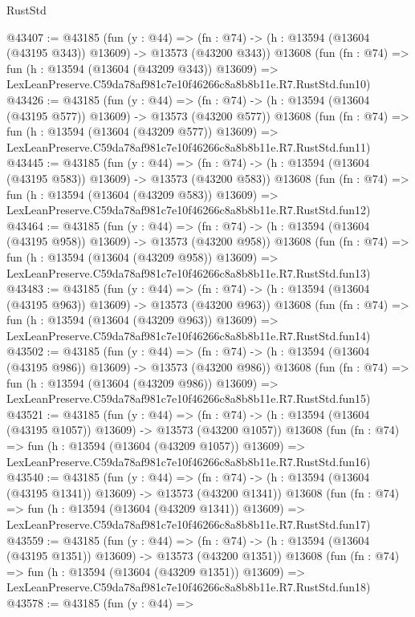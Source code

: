 \begin{lexlean}{RustStd}
\begin{coremodule}
@43407 := @43185
    (fun (y : @44) =>
    (fn : @74) -> (h : @13594 (@13604 (@43195 @343)) @13609) -> @13573 (@43200 @343))
    @13608
    (fun (fn : @74) =>
    fun (h : @13594 (@13604 (@43209 @343)) @13609) =>
    LexLeanPreserve.C59da78af981c7e10f46266c8a8b8b11e.R7.RustStd.fun10)
@43426 := @43185
    (fun (y : @44) =>
    (fn : @74) -> (h : @13594 (@13604 (@43195 @577)) @13609) -> @13573 (@43200 @577))
    @13608
    (fun (fn : @74) =>
    fun (h : @13594 (@13604 (@43209 @577)) @13609) =>
    LexLeanPreserve.C59da78af981c7e10f46266c8a8b8b11e.R7.RustStd.fun11)
@43445 := @43185
    (fun (y : @44) =>
    (fn : @74) -> (h : @13594 (@13604 (@43195 @583)) @13609) -> @13573 (@43200 @583))
    @13608
    (fun (fn : @74) =>
    fun (h : @13594 (@13604 (@43209 @583)) @13609) =>
    LexLeanPreserve.C59da78af981c7e10f46266c8a8b8b11e.R7.RustStd.fun12)
@43464 := @43185
    (fun (y : @44) =>
    (fn : @74) -> (h : @13594 (@13604 (@43195 @958)) @13609) -> @13573 (@43200 @958))
    @13608
    (fun (fn : @74) =>
    fun (h : @13594 (@13604 (@43209 @958)) @13609) =>
    LexLeanPreserve.C59da78af981c7e10f46266c8a8b8b11e.R7.RustStd.fun13)
@43483 := @43185
    (fun (y : @44) =>
    (fn : @74) -> (h : @13594 (@13604 (@43195 @963)) @13609) -> @13573 (@43200 @963))
    @13608
    (fun (fn : @74) =>
    fun (h : @13594 (@13604 (@43209 @963)) @13609) =>
    LexLeanPreserve.C59da78af981c7e10f46266c8a8b8b11e.R7.RustStd.fun14)
@43502 := @43185
    (fun (y : @44) =>
    (fn : @74) -> (h : @13594 (@13604 (@43195 @986)) @13609) -> @13573 (@43200 @986))
    @13608
    (fun (fn : @74) =>
    fun (h : @13594 (@13604 (@43209 @986)) @13609) =>
    LexLeanPreserve.C59da78af981c7e10f46266c8a8b8b11e.R7.RustStd.fun15)
@43521 := @43185
    (fun (y : @44) =>
    (fn : @74) -> (h : @13594 (@13604 (@43195 @1057)) @13609) -> @13573 (@43200 @1057))
    @13608
    (fun (fn : @74) =>
    fun (h : @13594 (@13604 (@43209 @1057)) @13609) =>
    LexLeanPreserve.C59da78af981c7e10f46266c8a8b8b11e.R7.RustStd.fun16)
@43540 := @43185
    (fun (y : @44) =>
    (fn : @74) -> (h : @13594 (@13604 (@43195 @1341)) @13609) -> @13573 (@43200 @1341))
    @13608
    (fun (fn : @74) =>
    fun (h : @13594 (@13604 (@43209 @1341)) @13609) =>
    LexLeanPreserve.C59da78af981c7e10f46266c8a8b8b11e.R7.RustStd.fun17)
@43559 := @43185
    (fun (y : @44) =>
    (fn : @74) -> (h : @13594 (@13604 (@43195 @1351)) @13609) -> @13573 (@43200 @1351))
    @13608
    (fun (fn : @74) =>
    fun (h : @13594 (@13604 (@43209 @1351)) @13609) =>
    LexLeanPreserve.C59da78af981c7e10f46266c8a8b8b11e.R7.RustStd.fun18)
@43578 := @43185
    (fun (y : @44) =>

\end{coremodule}
\end{lexlean}
